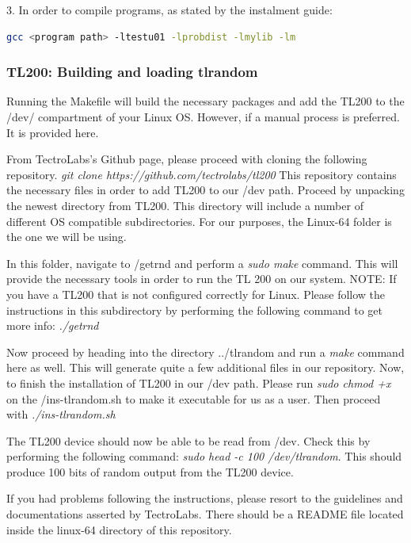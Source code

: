 \documentclass[]{final_report}
\begin{document}
3. In order to compile programs, as stated by the instalment guide:
\begin{lstlisting}[language=bash]
    gcc <program path> -ltestu01 -lprobdist -lmylib -lm
\end{lstlisting}

\subsubsection*{TL200: Building and loading tlrandom}
\par{Running the Makefile will build the necessary packages and add the TL200 to the /dev/ compartment of your Linux OS. However, if a manual process is preferred. It is provided here.}

\par{From TectroLabs's Github page, please proceed with cloning the following repository. \textit{git clone https://github.com/tectrolabs/tl200} This repository contains the necessary files in order to add TL200 to our /dev path. Proceed by unpacking the newest directory from TL200. This directory will include a number of different OS compatible subdirectories. For our purposes, the Linux-64 folder is the one we will be using.}

\par{In this folder, navigate to /getrnd and perform a \textit{sudo make} command. This will provide the necessary tools in order to run the TL 200 on our system. 
NOTE: If you have a TL200 that is not configured correctly for Linux. Please follow the instructions in this subdirectory by performing the following command to get more info: \textit{./getrnd}}

\par{Now proceed by heading into the directory ../tlrandom and run a \textit{make} command here as well. This will generate quite a few additional files in our repository. Now, to finish the installation of TL200 in our /dev path. Please run \textit{sudo chmod +x} on the /ins-tlrandom.sh to make it executable for us as a user. Then proceed with \textit{./ins-tlrandom.sh}}

\par{The TL200 device should now be able to be read from /dev. Check this by performing the following command: \textit{sudo head -c 100 /dev/tlrandom}. This should produce 100 bits of random output from the TL200 device.}

\par{If you had problems following the instructions, please resort to the guidelines and documentations asserted by TectroLabs. There should be a README file located inside the linux-64 directory of this repository.}
\end{document}
